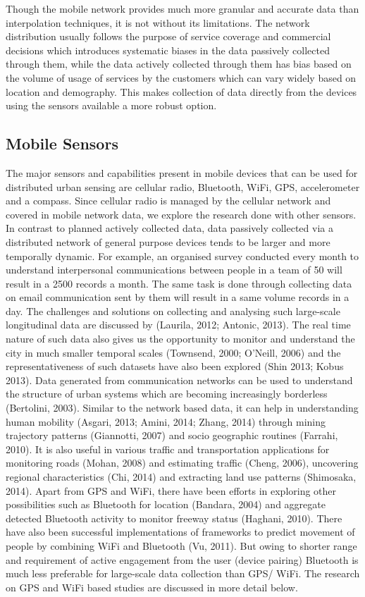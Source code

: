 Though the mobile network provides much more granular and accurate data than interpolation techniques, it is not without its limitations.
The network distribution usually follows the purpose of service coverage and commercial decisions which introduces systematic biases in the data passively collected through them, while the data actively collected through them has bias based on the volume of usage of services by the customers which can vary widely based on location and demography.
This makes collection of data directly from the devices using the sensors available a more robust option.

\subsection{Mobile Sensors}

The major sensors and capabilities present in mobile devices that can be used for distributed urban sensing are cellular radio, Bluetooth, WiFi, GPS, accelerometer and a compass.
Since cellular radio is managed by the cellular network and covered in mobile network data, we explore the research done with other sensors.
In contrast to planned actively collected data, data passively collected via a distributed network of general purpose devices tends to be larger and more temporally dynamic.
For example, an organised survey conducted every month to understand interpersonal communications between people in a team of 50 will result in a 2500 records a month.
The same task is done through collecting data on email communication sent by them will result in a same volume records in a day.
The challenges and solutions on collecting and analysing such large-scale longitudinal data are discussed by (Laurila, 2012; Antonic, 2013).
The real time nature of such data also gives us the opportunity to monitor and understand the city in much smaller temporal scales (Townsend, 2000; O'Neill, 2006) and the representativeness of such datasets have also been explored (Shin 2013; Kobus 2013).
Data generated from communication networks can be used to understand the structure of urban systems which are becoming increasingly borderless (Bertolini, 2003).
Similar to the network based data, it can help in understanding human mobility (Asgari, 2013; Amini, 2014; Zhang, 2014) through mining trajectory patterns (Giannotti, 2007) and socio geographic routines (Farrahi, 2010).
It is also useful in various traffic and transportation applications for monitoring roads (Mohan, 2008) and estimating traffic (Cheng, 2006), uncovering regional characteristics (Chi, 2014) and extracting land use patterns (Shimosaka, 2014).
Apart from GPS and WiFi, there have been efforts in exploring other possibilities such as Bluetooth for location (Bandara, 2004) and aggregate detected Bluetooth activity to monitor freeway status (Haghani, 2010).
There have also been successful implementations of frameworks to predict movement of people by combining WiFi and Bluetooth (Vu, 2011).
But owing to shorter range and requirement of active engagement from the user (device pairing) Bluetooth is much less preferable for large-scale data collection than GPS/ WiFi.
The research on GPS and WiFi based studies are discussed in more detail below.

